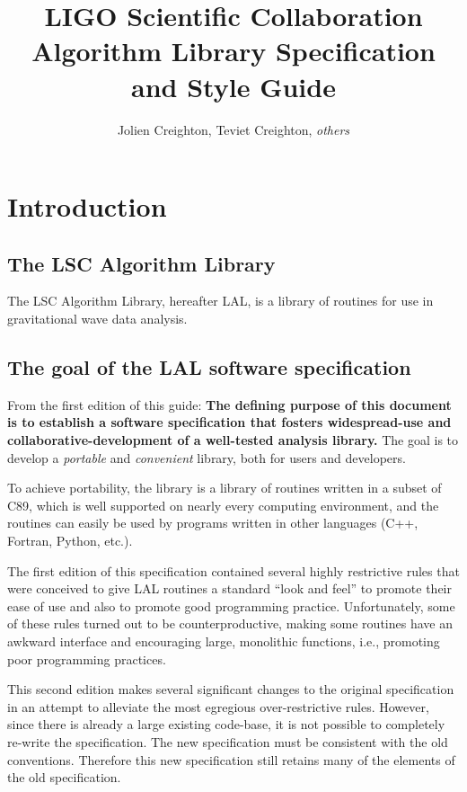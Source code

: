\documentclass[10pt]{ligodcc}
\title{LIGO Scientific Collaboration Algorithm Library Specification and Style
Guide}
\author{Jolien Creighton, Teviet Creighton, \emph{others}}
\begin{document}
\maketitle


\tableofcontents


\section{Introduction}
\label{s:intro}


\subsection{The LSC Algorithm Library}

The LSC Algorithm Library, hereafter LAL, is a library of routines for use in
gravitational wave data analysis.


\subsection{The goal of the LAL software specification}

From the first edition of this guide: \textbf{The defining purpose of this
document is to establish a software specification that fosters widespread-use
and collaborative-development of a well-tested analysis library.}  The goal is
to develop a \emph{portable} and \emph{convenient} library, both for users and
developers.

To achieve portability, the library is a library of routines written in a
subset of C89, which is well supported on nearly every computing environment,
and the routines can easily be used by programs written in other languages
(C++, Fortran, Python, etc.).

The first edition of this specification contained several highly restrictive
rules that were conceived to give LAL routines a standard ``look and feel''
to promote their ease of use and also to promote good programming practice.
Unfortunately, some of these rules turned out to be counterproductive, making
some routines have an awkward interface and encouraging large, monolithic
functions, i.e., promoting poor programming practices.

This second edition makes several significant changes to the original
specification in an attempt to alleviate the most egregious over-restrictive
rules.  However, since there is already a large existing code-base, it is
not possible to completely re-write the specification.  The new specification
must be consistent with the old conventions.  Therefore this new specification
still retains many of the elements of the old specification.
\end{document}
